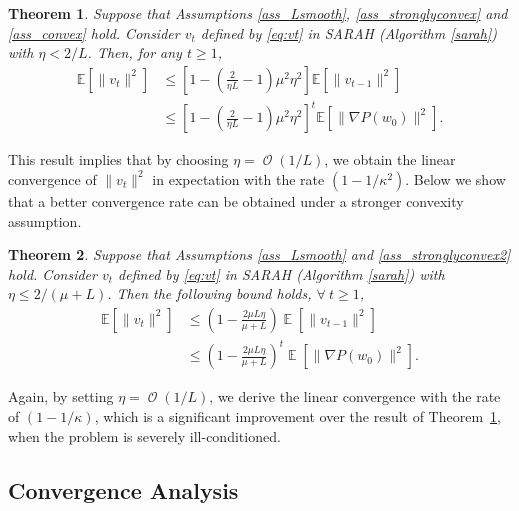 \documentclass{article}
\makeatletter
\newtheorem{thm}{Theorem}
\DeclareMathOperator{\Exp}{\mathbb{E}}           %
\DeclareMathOperator{\Ocal}{\mathcal{O}}
\newcounter{subthm}
\newenvironment{subthm}
 {%
  \setcounter{subthm}{0}%
  \stepcounter{thm}%
  \edef\saved@thm{\thethm}%
  \let\c@thm\c@subthm     %
  \renewcommand{\thethm}{\saved@thm\alph{thm}}%
 }
 {}
\makeatother
\begin{document}
\begin{subthm}
\begin{thm}\label{lem_bouned_moment_stronglyconvexP}
Suppose that Assumptions \ref{ass_Lsmooth}, \ref{ass_stronglyconvex} and \ref{ass_convex} hold. Consider $v_{t}$ defined by \eqref{eq:vt} in SARAH (Algorithm \ref{sarah}) with $\eta < 2/L$. Then, for any $t\geq 1$,
\begin{align*}
\mathbb{E}[\|v_{t}\|^2]
 &\leq \left[ 1 - \left(\tfrac{2}{\eta L} - 1 \right) \mu^2 \eta^2  \right] \mathbb{E}[\|v_{t-1}\|^2]
 \\%
 &\leq \left[ 1 - \left(\tfrac{2}{\eta L} - 1 \right) \mu^2 \eta^2  \right]^{t} \mathbb{E}[\| \nabla P(w_{0}) \|^2].
\end{align*}
\end{thm}
This result implies that by choosing $\eta=\Ocal(1/L)$, we obtain the linear  convergence of $\|v_t\|^2$ in expectation with the rate $(1-1/\kappa^2)$. Below we show that
 a better convergence rate can be obtained under a  stronger convexity assumption. 

\begin{thm}\label{thm:bound_moment}
Suppose that Assumptions \ref{ass_Lsmooth} and \ref{ass_stronglyconvex2} hold.  Consider $v_{t}$ defined by \eqref{eq:vt} in SARAH (Algorithm \ref{sarah}) with $\eta \leq 2/(\mu+L)$. Then the following bound holds, $\forall\ t\geq 1$, 
\begin{align*}
\mathbb{E}[\| v_{t} \|^2 ]
& \leq \left( 1 - \tfrac{2 \mu L \eta}{\mu + L} \right) \Exp[  \|v_{t-1} \|^2 ]
\\%
& \leq \left(1 - \tfrac{2\mu L \eta}{\mu + L} \right)^{t} \Exp[ \| \nabla P(w_{0}) \|^2]. 
\end{align*}
\end{thm}

\end{subthm}

Again, by setting $\eta=\Ocal(1/L)$, we derive the linear convergence with the rate of $(1-1/\kappa)$, which is a significant improvement over the result of Theorem~\ref{lem_bouned_moment_stronglyconvexP}, when the problem is severely ill-conditioned.

\subsection{Convergence Analysis}

\end{document}
